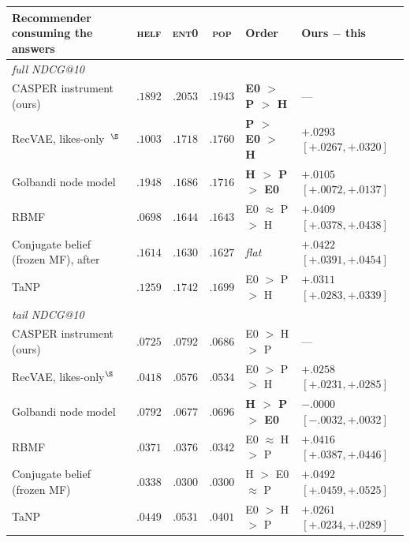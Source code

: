 \documentclass[acmsmall,review,anonymous]{acmart}
\begin{document}
\begin{table}[t]\centering\scriptsize
\setlength{\tabcolsep}{4pt}
\renewcommand{\arraystretch}{1.18}
\begin{tabular}{p{3.6cm}ccc l l}
\toprule
Recommender consuming the answers & \textsc{helf} & \textsc{ent0} & \textsc{pop} &
  Order & Ours $-$ this \\
\midrule
\multicolumn{6}{l}{\emph{full NDCG@10}}\\
CASPER instrument (ours) & $.1892$ & $\mathbf{.2053}$ & $.1943$ & \textbf{E0 $>$ P $>$ H} & --- \\
RecVAE, likes-only~\citep{ren2020recvae}$^{\S}$ & $.1003$ & $.1718$ & $\mathbf{.1760}$ & \textbf{P $>$ E0 $>$ H} & $+.0293$ $[+.0267,+.0320]$ \\
Golbandi node model~\citep{golbandi2011adaptive} & $\mathbf{.1948}$ & $.1686$ & $.1716$ & \textbf{H $>$ P $>$ E0} & $+.0105$ $[+.0072,+.0137]$ \\
RBMF~\citep{liu2011wisdom,zhou2011functional} & $.0698$ & $\mathbf{.1644}$ & $.1643$ & E0 $\approx$ P $>$ H & $+.0409$ $[+.0378,+.0438]$ \\
Conjugate belief (frozen MF), after~\citet{biyik2023soft} & $.1614$ & $.1630$ & $.1627$ & \emph{flat} & $+.0422$ $[+.0391,+.0454]$ \\
TaNP~\citep{lin2021tanp} & $.1259$ & $\mathbf{.1742}$ & $.1699$ & E0 $>$ P $>$ H & $+.0311$ $[+.0283,+.0339]$ \\
\midrule
\multicolumn{6}{l}{\emph{tail NDCG@10}}\\
CASPER instrument (ours) & $.0725$ & $\mathbf{.0792}$ & $.0686$ & E0 $>$ H $>$ P & --- \\
RecVAE, likes-only$^{\S}$ & $.0418$ & $\mathbf{.0576}$ & $.0534$ & E0 $>$ P $>$ H & $+.0258$ $[+.0231,+.0285]$ \\
Golbandi node model & $\mathbf{.0792}$ & $.0677$ & $.0696$ & \textbf{H $>$ P $>$ E0} & $-.0000$ $[-.0032,+.0032]$ \\
RBMF & $.0371$ & $\mathbf{.0376}$ & $.0342$ & E0 $\approx$ H $>$ P & $+.0416$ $[+.0387,+.0446]$ \\
Conjugate belief (frozen MF) & $\mathbf{.0338}$ & $.0300$ & $.0300$ & H $>$ E0 $\approx$ P & $+.0492$ $[+.0459,+.0525]$ \\
TaNP & $.0449$ & $\mathbf{.0531}$ & $.0401$ & E0 $>$ H $>$ P & $+.0261$ $[+.0234,+.0289]$ \\
\bottomrule
\end{tabular}

\end{table}
\end{document}
